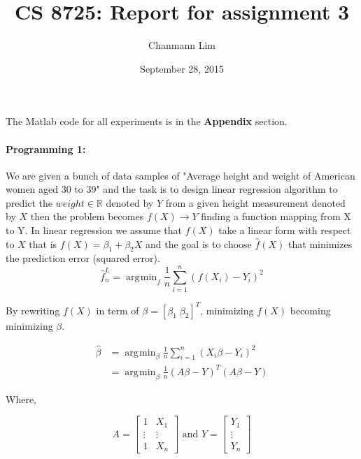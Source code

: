 \documentclass[a4paper]{article}
\DeclareMathOperator*{\argmin}{\arg\!\min}
\begin{document}
\title{CS 8725: Report for assignment 3}
\author{Chanmann Lim}
\date{September 28, 2015}
\maketitle

\noindent
	The Matlab code for all experiments is in the \textbf{Appendix} section.

\paragraph{Programming 1:} We are given a bunch of data samples of "Average height and weight of American women aged 30 to 39" and the task is to design linear regression algorithm to predict the $ weight \in \mathbb{R}$ denoted by $Y$ from a given height measurement denoted by $X$ then the problem becomes $f(X) \to Y$ finding a function mapping from X to Y. In linear regression we assume that $f(X)$ take a linear form with respect to $X$ that is $f(X) = \beta_1 + \beta_2X$ and the goal is to choose $\hat{f}(X)$ that minimizes the prediction error (squared error). \\

	\begin{equation}
		\hat{f}_n^L = \argmin_f \frac{1}{n} \sum_{i=1}^n (f(X_i) - Y_i)^2
	\end{equation}

	By rewriting $f(X)$ in term of $\beta = [\beta_1\; \beta_2]^T$, minimizing $f(X)$ becoming minimizing $\beta$.
	
	\begin{align}
		\hat{\beta} &= \argmin_{\beta} \frac{1}{n} \sum_{i=1}^n (X_i\beta - Y_i)^2\\
			&= \argmin_{\beta} \frac{1}{n} (A\beta - Y)^T(A\beta - Y)  \label{eq:beta_hat}
	\end{align}
	
	Where, 
	
	\begin{equation}
		A = \begin{bmatrix} 
				1 & X_1 \\ 
				\vdots & \vdots \\ 
				1 & X_n 
			\end{bmatrix} \text{ and }
		Y = \begin{bmatrix} 
				Y_1 \\ 
				\vdots \\ 
				Y_n 
			\end{bmatrix}
	\end{equation}
	
\end{document}
